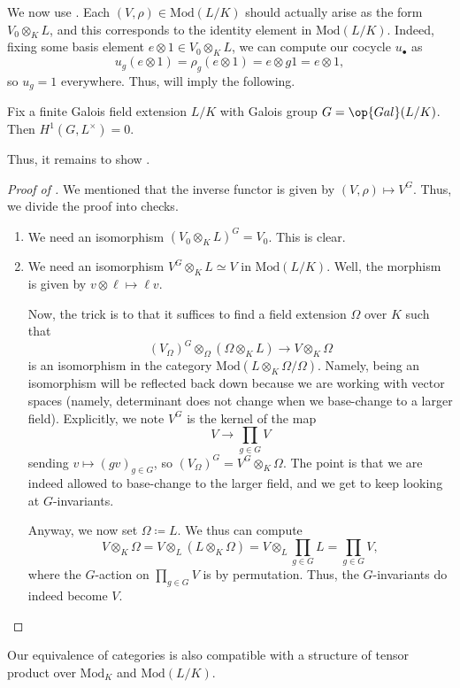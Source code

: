 \documentclass[../notes.tex]{subfiles}
\begin{document}
We now use . Each $(V,\rho)\in\mathrm{Mod}(L/K)$ should actually arise as the form $V_0\otimes_KL$, and this corresponds to the identity element in $\mathrm{Mod}(L/K)$. Indeed, fixing some basis element $e\otimes1\in V_0\otimes_KL$, we can compute our cocycle $u_\bullet$ as
\[u_g(e\otimes1)=\rho_g(e\otimes1)=e\otimes g1=e\otimes1,\]
so $u_g=1$ everywhere. Thus,  will imply the following.
\begin{theorem}[Hilbert 90]
	Fix a finite Galois field extension $L/K$ with Galois group $G=\op{Gal}(L/K)$. Then $H^1(G,L^\times)=0$.
\end{theorem}
Thus, it remains to show .
\begin{proof}[Proof of ]
	We mentioned that the inverse functor is given by $(V,\rho)\mapsto V^G$. Thus, we divide the proof into checks.
	\begin{enumerate}
		\item We need an isomorphism $(V_0\otimes_KL)^G=V_0$. This is clear.
		\item We need an isomorphism $V^G\otimes_KL\simeq V$ in $\mathrm{Mod}(L/K)$. Well, the morphism is given by $v\otimes\ell\mapsto\ell v$.

		Now, the trick is to that it suffices to find a field extension $\Omega$ over $K$ such that
		\[(V_\Omega)^G\otimes_\Omega(\Omega\otimes_KL)\to V\otimes_K\Omega\]
		is an isomorphism in the category $\mathrm{Mod}(L\otimes_K\Omega/\Omega)$. Namely, being an isomorphism will be reflected back down because we are working with vector spaces (namely, determinant does not change when we base-change to a larger field). Explicitly, we note $V^G$ is the kernel of the map
		\[V\to\prod_{g\in G}V\]
		sending $v\mapsto(gv)_{g\in G}$, so $(V_\Omega)^G=V^G\otimes_K\Omega$. The point is that we are indeed allowed to base-change to the larger field, and we get to keep looking at $G$-invariants.

		Anyway, we now set $\Omega\coloneqq L$. We thus can compute
		\[V\otimes_K\Omega=V\otimes_L(L\otimes_K\Omega)=V\otimes_L\prod_{g\in G}L=\prod_{g\in G}V,\]
		where the $G$-action on $\prod_{g\in G}V$ is by permutation. Thus, the $G$-invariants do indeed become $V$.
		\qedhere
	\end{enumerate}
\end{proof}
\begin{remark} \label{rem:tensor-equiv}
	Our equivalence of categories is also compatible with a structure of tensor product over $\mathrm{Mod}_K$ and $\mathrm{Mod}(L/K)$.
\end{remark}
\end{document}
